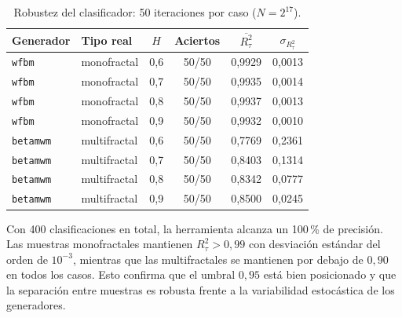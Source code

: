 \begin{table}[H]
\centering
\caption{Robustez del clasificador: 50 iteraciones por caso ($N = 2^{17}$).}
\label{tab:robustez}
\begin{tabular}{llcccc}
    \toprule
    \textbf{Generador} & \textbf{Tipo real} & $H$ & \textbf{Aciertos}
        & $\overline{R^2_{\tau}}$ & $\sigma_{R^2_{\tau}}$ \\
    \midrule
    \texttt{wfbm}    & monofractal  & 0,6 & 50/50 & 0,9929 & 0,0013 \\
    \texttt{wfbm}    & monofractal  & 0,7 & 50/50 & 0,9935 & 0,0014 \\
    \texttt{wfbm}    & monofractal  & 0,8 & 50/50 & 0,9937 & 0,0013 \\
    \texttt{wfbm}    & monofractal  & 0,9 & 50/50 & 0,9932 & 0,0010 \\
    \midrule
    \texttt{betamwm} & multifractal & 0,6 & 50/50 & 0,7769 & 0,2361 \\
    \texttt{betamwm} & multifractal & 0,7 & 50/50 & 0,8403 & 0,1314 \\
    \texttt{betamwm} & multifractal & 0,8 & 50/50 & 0,8342 & 0,0777 \\
    \texttt{betamwm} & multifractal & 0,9 & 50/50 & 0,8500 & 0,0245 \\
    \bottomrule
\end{tabular}
\end{table}

Con 400 clasificaciones en total, la herramienta alcanza un 100\,\% de precisión.
Las muestras monofractales mantienen $R^2_{\tau} > 0{,}99$ con desviación
estándar del orden de $10^{-3}$, mientras que las multifractales se mantienen por
debajo de $0{,}90$ en todos los casos. Esto confirma que el umbral $0{,}95$ está
bien posicionado y que la separación entre muestras es robusta frente a la
variabilidad estocástica de los generadores.
